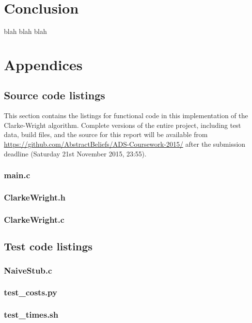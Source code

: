 \documentclass[a4paper]{article}
\begin{document}
    \section{Conclusion}
    blah blah blah

    
    
    
    \section{Appendices}
        \subsection{Source code listings}
            This section contains the listings for functional code in this implementation of the Clarke-Wright algorithm.
            Complete versions of the entire project, including test data, build files, and the source for this report will be available from
            \url{https://github.com/AbstractBeliefs/ADS-Coursework-2015/} after the submission deadline (Saturday 21st November 2015, 23:55).
            \subsubsection{main.c}
                
            \subsubsection{ClarkeWright.h}
                
            \subsubsection{ClarkeWright.c}
                
        \subsection{Test code listings}
            \subsubsection{NaiveStub.c}
                
            \subsubsection{test\_costs.py}
                
            \subsubsection{test\_times.sh}
                
\end{document}
